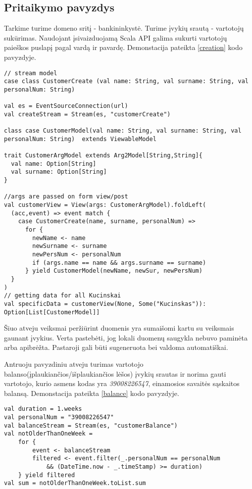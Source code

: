 \subsection{Pritaikymo pavyzdys}

    Tarkime turime domeno sritį - bankininkystė. Turime įvykių srautą - vartotojų sukūrimas. Naudojant įsivaizduojamą Scala API galima sukurti vartotojų paieškos puslapį pagal vardą ir pavardę. Demonstacija pateikta \ref{creation} kodo pavyzdyje.

\begin{lstlisting}[caption=- vartotojų paieškos puslapis naudojant įsivaizduojamą Scala API, label=creation]
// stream model
case class CustomerCreate (val name: String, val surname: String, val personalNum: String)

val es = EventSourceConnection(url)
val createStream = Stream(es, "customerCreate")

class case CustomerModel(val name: String, val surname: String, val personalNum: String)  extends ViewableModel

trait CustomerArgModel extends Arg2Model[String,String]{
  val name: Option[String]
  val surname: Option[String]
}

//args are passed on form view/post
val customerView = View(args: CustomerArgModel).foldLeft(
  (acc,event) => event match {
    case CustomerCreate(name, surname, personalNum) =>
      for {
        newName <- name
        newSurname <- surname
        newPersNum <- personalNum
        if (args.name == name && args.surname == surname)
      } yield CustomerModel(newName, newSur, newPersNum)
  }
)
// getting data for all Kucinskai
val specificData = customerView(None, Some("Kucinskas")): Option[List[CustomerModel]]
\end{lstlisting}

    Šiuo atveju veiksmai peržiūrint duomenis yra sumaišomi kartu su veiksmais gaunant įvykius. Verta pastebėti, jog lokali duomenų saugykla nebuvo paminėta arba apibrėžta. Pastaroji gali būti sugeneruota bei valdoma automatiškai.

    Antruoju pavyzdiniu atveju turimas vartotojo balanso(įplaukiančios/išplaukiančios lėšos) įvykių srautas ir norima gauti vartotojo, kurio asmens kodas yra \emph{39008226547}, einamosios savaitės sąskaitos balansą. Demonstacija pateikta \ref{balance} kodo pavyzdyje.

\begin{lstlisting}[caption=- vartotojo einamosios sąskaitos balansas naudojant įsivaizduojamą Scala API, label=balance]
val duration = 1.weeks
val personalNum = "39008226547"
val balanceStream = Stream(es, "customerBalance")
val notOlderThanOneWeek =
    for {
        event <- balanceStream
        filtered <- event.filter(_.personalNum == personalNum
            && (DateTime.now - _.timeStamp) >= duration)
    } yield filtered
val sum = notOlderThanOneWeek.toList.sum
\end{lstlisting}

